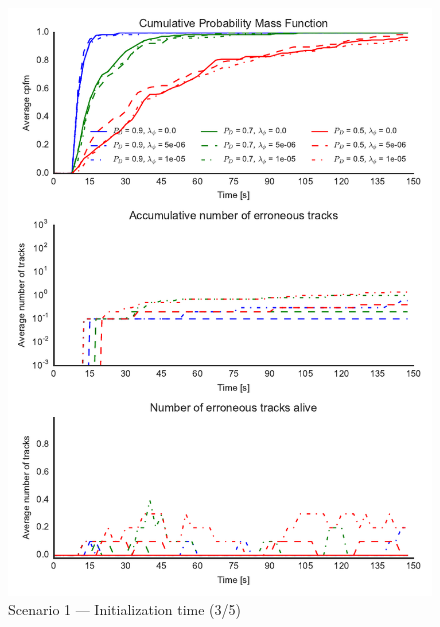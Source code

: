 \begin{figure}
\centering
\includegraphics{Figures/plots/Scenario1_Init-Time(3-5).pdf}
\caption{Scenario 1 --- Initialization time (3/5)}\label{fig:init1_time_3-5}
\end{figure}

